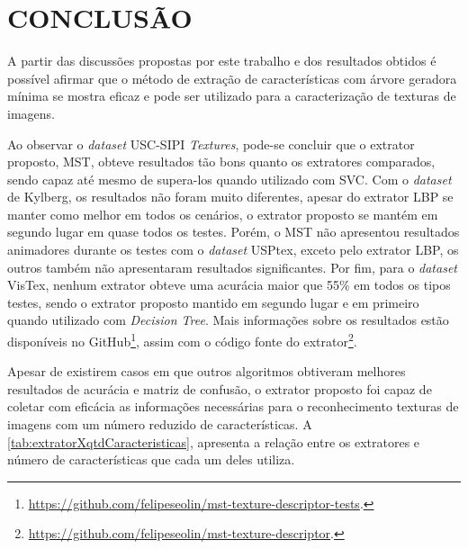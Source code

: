 \chapter{CONCLUSÃO}
\label{chap:conclusao}

\par A partir das discussões propostas por este trabalho e dos resultados obtidos é possível afirmar que o método de extração de características com árvore geradora mínima se mostra eficaz e pode ser utilizado para a caracterização de texturas de imagens.

\par Ao observar o \textit{dataset} USC-SIPI \textit{Textures}, pode-se concluir que o extrator proposto, MST, obteve resultados tão bons quanto os extratores comparados, sendo capaz até mesmo de supera-los quando utilizado com SVC. Com o \textit{dataset} de Kylberg, os resultados não foram muito diferentes, apesar do extrator LBP se manter como melhor em todos os cenários, o extrator proposto se mantém em segundo lugar em quase todos os testes. Porém, o MST não apresentou resultados animadores durante os testes com o \textit{dataset} USPtex, exceto pelo extrator LBP, os outros também não apresentaram resultados significantes. Por fim, para o \textit{dataset} VisTex, nenhum extrator obteve uma acurácia maior que 55\% em todos os tipos testes, sendo o extrator proposto mantido em segundo lugar e em primeiro quando utilizado com \textit{Decision Tree}. Mais informações sobre os resultados estão disponíveis no GitHub\footnote{\url{https://github.com/felipeseolin/mst-texture-descriptor-tests}.}, assim com o código fonte do extrator\footnote{\url{https://github.com/felipeseolin/mst-texture-descriptor}.}.

\par Apesar de existirem casos em que outros algoritmos obtiveram melhores resultados de acurácia e matriz de confusão, o extrator proposto foi capaz de coletar com eficácia as informações necessárias para o reconhecimento texturas de imagens com um número reduzido de características. A \autoref{tab:extratorXqtdCaracteristicas}, apresenta a relação entre os extratores e número de características que cada um deles utiliza.




